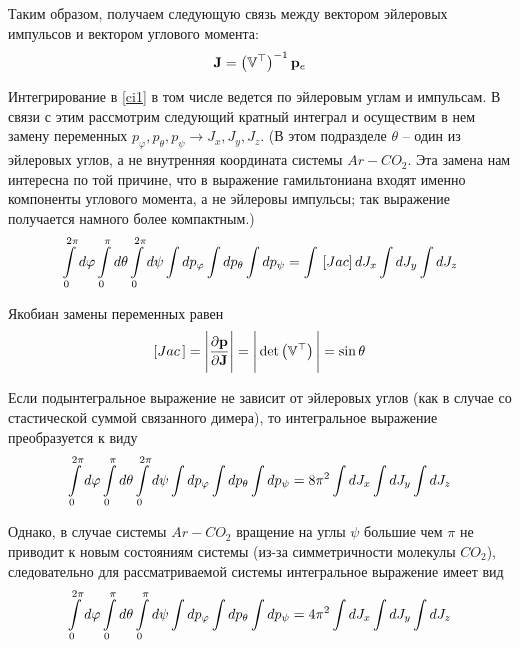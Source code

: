Таким образом, получаем следующую связь между вектором эйлеровых импульсов и вектором углового момента:
\vverh
\begin{gather}
	\mathbf{J} = \left( \mathbb{V}^\top \right)^{-1} \mathbf{p}_e \notag
\end{gather}

Интегрирование в \eqref{ci1} в том числе ведется по эйлеровым углам и импульсам. В связи с этим рассмотрим следующий кратный интеграл и осуществим в нем замену переменных $p_\varphi, p_\theta, p_\psi \longrightarrow J_x, J_y, J_z$. (В этом подразделе $\theta$ -- один из эйлеровых углов, а не внутренняя координата системы $Ar-CO_2$. Эта замена нам интересна по той причине, что в выражение гамильтониана входят именно компоненты углового момента, а не эйлеровы импульсы; так выражение получается намного более компактным.)
\vverh
\begin{gather}
	\int\limits_{0}^{2 \pi} d \varphi \int\limits_{0}^{\pi} d \theta \int\limits_{0}^{2 \pi} d \psi \int d p_\varphi \int d p_\theta \int d p_\psi = \int \, \left[ Jac \right] d J_x \int d J_y \int d J_z \notag
\end{gather}

Якобиан замены переменных равен
\vverh
\begin{gather}
	\left[ Jac \, \right] = \Bigg{|} \frac{\partial \mathbf{p}}{\partial \mathbf{J}} \Bigg{|} = \Bigg{|} \det \left( \mathbb{V}^\top \right) \Bigg{|} = \sin \theta \notag
\end{gather}

Если подынтегральное выражение не зависит от эйлеровых углов (как в случае со стастической суммой связанного димера), то интегральное выражение преобразуется к виду
\vverh
\begin{gather}
	\int\limits_{0}^{2 \pi} d \varphi \int\limits_{0}^{\pi} d \theta \int\limits_{0}^{2 \pi} d \psi \int d p_\varphi \int d p_\theta \int d p_\psi = 8 \pi^2 \int d J_x \int d J_y \int d J_z \notag 
\end{gather}

Однако, в случае системы $Ar-CO_2$ вращение на углы $\psi$ большие чем $\pi$ не приводит к новым состояниям системы (из-за симметричности молекулы $CO_2$), следовательно для рассматриваемой системы интегральное выражение имеет вид
\vverh
\begin{gather}
	\int\limits_{0}^{2 \pi} d \varphi \int\limits_{0}^{\pi} d \theta \int\limits_{0}^{\pi} d \psi \int d p_\varphi \int d p_\theta \int d p_\psi = 4 \pi^2 \int d J_x \int d J_y \int d J_z \notag 
\end{gather}

